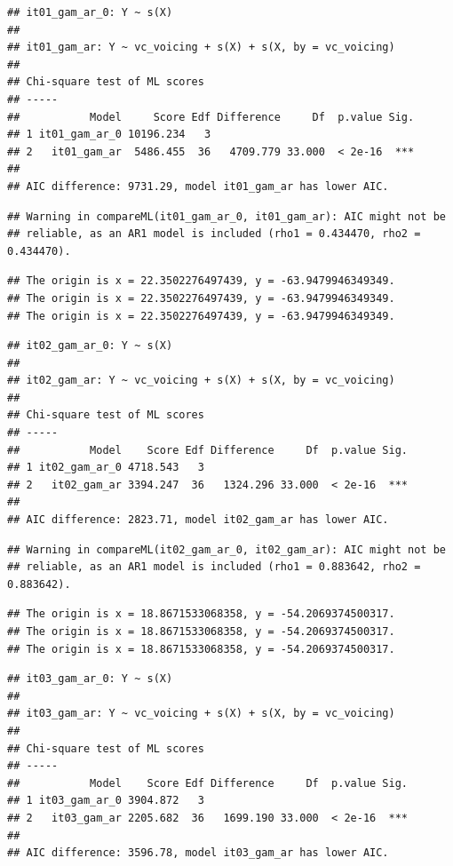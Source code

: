 \documentclass[12pt,]{article}
\begin{document}
\begin{verbatim}
## it01_gam_ar_0: Y ~ s(X)
## 
## it01_gam_ar: Y ~ vc_voicing + s(X) + s(X, by = vc_voicing)
## 
## Chi-square test of ML scores
## -----
##           Model     Score Edf Difference     Df  p.value Sig.
## 1 it01_gam_ar_0 10196.234   3                                
## 2   it01_gam_ar  5486.455  36   4709.779 33.000  < 2e-16  ***
## 
## AIC difference: 9731.29, model it01_gam_ar has lower AIC.
\end{verbatim}

\begin{verbatim}
## Warning in compareML(it01_gam_ar_0, it01_gam_ar): AIC might not be
## reliable, as an AR1 model is included (rho1 = 0.434470, rho2 = 0.434470).
\end{verbatim}

\begin{verbatim}
## The origin is x = 22.3502276497439, y = -63.9479946349349.
## The origin is x = 22.3502276497439, y = -63.9479946349349.
## The origin is x = 22.3502276497439, y = -63.9479946349349.
\end{verbatim}

\begin{verbatim}
## it02_gam_ar_0: Y ~ s(X)
## 
## it02_gam_ar: Y ~ vc_voicing + s(X) + s(X, by = vc_voicing)
## 
## Chi-square test of ML scores
## -----
##           Model    Score Edf Difference     Df  p.value Sig.
## 1 it02_gam_ar_0 4718.543   3                                
## 2   it02_gam_ar 3394.247  36   1324.296 33.000  < 2e-16  ***
## 
## AIC difference: 2823.71, model it02_gam_ar has lower AIC.
\end{verbatim}

\begin{verbatim}
## Warning in compareML(it02_gam_ar_0, it02_gam_ar): AIC might not be
## reliable, as an AR1 model is included (rho1 = 0.883642, rho2 = 0.883642).
\end{verbatim}

\begin{verbatim}
## The origin is x = 18.8671533068358, y = -54.2069374500317.
## The origin is x = 18.8671533068358, y = -54.2069374500317.
## The origin is x = 18.8671533068358, y = -54.2069374500317.
\end{verbatim}

\begin{verbatim}
## it03_gam_ar_0: Y ~ s(X)
## 
## it03_gam_ar: Y ~ vc_voicing + s(X) + s(X, by = vc_voicing)
## 
## Chi-square test of ML scores
## -----
##           Model    Score Edf Difference     Df  p.value Sig.
## 1 it03_gam_ar_0 3904.872   3                                
## 2   it03_gam_ar 2205.682  36   1699.190 33.000  < 2e-16  ***
## 
## AIC difference: 3596.78, model it03_gam_ar has lower AIC.
\end{verbatim}
\end{document}
